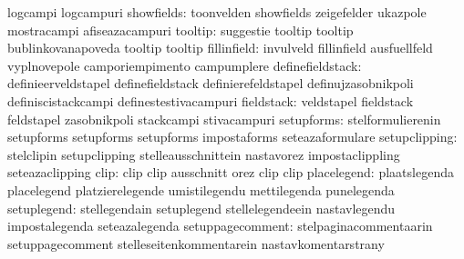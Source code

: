                                   logcampi                         logcampuri %
                      showfields: toonvelden                       showfields
                                  zeigefelder                      ukazpole
                                  mostracampi                      afiseazacampuri
                         tooltip: suggestie                        tooltip
                                  tooltip                          bublinkovanapoveda
                                  tooltip                          tooltip %
                     fillinfield: invulveld                        fillinfield
                                  ausfuellfeld                     vyplnovepole
                                  camporiempimento                 campumplere
                definefieldstack: definieerveldstapel              definefieldstack
                                  definierefeldstapel              definujzasobnikpoli
                                  definiscistackcampi              definestestivacampuri %
                      fieldstack: veldstapel                       fieldstack
                                  feldstapel                       zasobnikpoli
                                  stackcampi                       stivacampuri
                      setupforms: stelformulierenin                setupforms
                                  setupforms                       setupforms
                                  impostaforms                     seteazaformulare %
                   setupclipping: stelclipin                       setupclipping
                                  stelleausschnittein              nastavorez
                                  impostaclippling                 seteazaclipping %
                            clip: clip                             clip
                                  ausschnitt                       orez
                                  clip                             clip
                     placelegend: plaatslegenda                    placelegend
                                  platzierelegende                 umistilegendu
                                  mettilegenda                     punelegenda
                     setuplegend: stellegendain                    setuplegend
                                  stellelegendeein                 nastavlegendu
                                  impostalegenda                   seteazalegenda
                setuppagecomment: stelpaginacommentaarin           setuppagecomment
                                  stelleseitenkommentarein         nastavkomentarstrany

